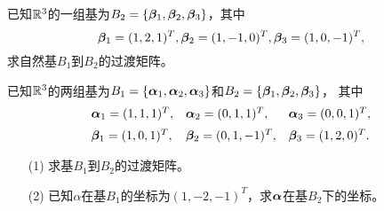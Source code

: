 \begin{li}
  已知$\mathbb R^3$的一组基为$B_2=\{\boldsymbol{\beta}_1,\boldsymbol{\beta}_2,\boldsymbol{\beta}_3\}$，其中
  $$\boldsymbol{\beta}_1=(1,2,1)^T,\boldsymbol{\beta}_2=(1,-1,0)^T,\boldsymbol{\beta}_3=(1,0,-1)^T,$$
  求自然基$B_1$到$B_2$的过渡矩阵。
\end{li}






\begin{li}
  已知$\mathbb R^3$的两组基为$B_1=\{\boldsymbol{\alpha}_1,\boldsymbol{\alpha}_2,\boldsymbol{\alpha}_3\}$和$B_2=\{\boldsymbol{\beta}_1,\boldsymbol{\beta}_2,\boldsymbol{\beta}_3\}$，
  其中
  $$
  \begin{array}{lll}
    \boldsymbol{\alpha}_1=(1,1,1)^T,&\boldsymbol{\alpha}_2=(0,1,1)^T,&\boldsymbol{\alpha}_3=(0,0,1)^T, \\[0.2cm]
    \boldsymbol{\beta}_1=(1,0,1)^T,&\boldsymbol{\beta}_2=(0,1,-1)^T,&\boldsymbol{\beta}_3=(1,2,0)^T.  
  \end{array}
  $$
  \begin{itemize}
  \item[(1)] 求基$B_1$到$B_2$的过渡矩阵。
  \item[(2)] 已知$\alpha$在基$B_1$的坐标为$(1,-2,-1)^T$，求$\boldsymbol{\alpha}$在基$B_2$下的坐标。
  \end{itemize}
  
\end{li}




